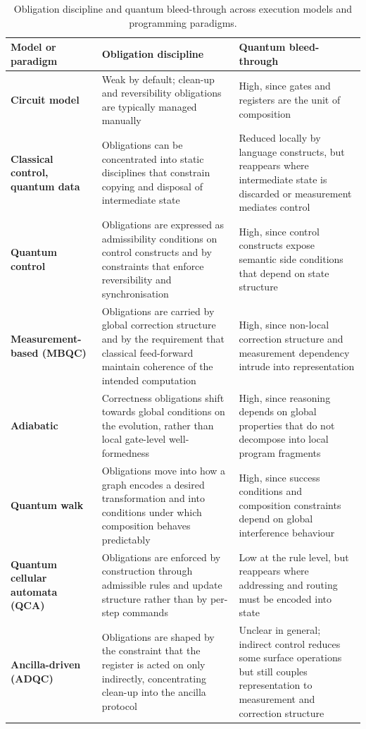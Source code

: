 \begin{table}[htbp]
    \centering
    \caption{Obligation discipline and quantum bleed-through across execution models and programming paradigms.}
    \label{tab:lit_rev:quantum_programming:design_space_map_obl_bleed}
    \footnotesize
    \begin{tabularx}{\textwidth}{@{}p{2.0cm}XX@{}}
		\toprule
        \textbf{Model or paradigm} & \textbf{Obligation discipline} & \textbf{Quantum bleed-through} \\
        \midrule
        \textbf{Circuit model} & Weak by default; clean-up and reversibility obligations are typically managed manually & High, since gates and registers are the unit of composition \\
        \addlinespace
        \textbf{Classical control, quantum data} & Obligations can be concentrated into static disciplines that constrain copying and disposal of intermediate state & Reduced locally by language constructs, but reappears where intermediate state is discarded or measurement mediates control \\
        \addlinespace
        \textbf{Quantum control} & Obligations are expressed as admissibility conditions on control constructs and by constraints that enforce reversibility and synchronisation & High, since control constructs expose semantic side conditions that depend on state structure \\
        \addlinespace
        \textbf{Measurement-based (MBQC)} & Obligations are carried by global correction structure and by the requirement that classical feed-forward maintain coherence of the intended computation & High, since non-local correction structure and measurement dependency intrude into representation \\
        \addlinespace
        \textbf{Adiabatic} & Correctness obligations shift towards global conditions on the evolution, rather than local gate-level well-formedness & High, since reasoning depends on global properties that do not decompose into local program fragments \\
        \addlinespace
        \textbf{Quantum walk} & Obligations move into how a graph encodes a desired transformation and into conditions under which composition behaves predictably & High, since success conditions and composition constraints depend on global interference behaviour \\
        \addlinespace
        \textbf{Quantum cellular automata (QCA)} & Obligations are enforced by construction through admissible rules and update structure rather than by per-step commands & Low at the rule level, but reappears where addressing and routing must be encoded into state \\
        \addlinespace
        \textbf{Ancilla-driven (ADQC)} & Obligations are shaped by the constraint that the register is acted on only indirectly, concentrating clean-up into the ancilla protocol & Unclear in general; indirect control reduces some surface operations but still couples representation to measurement and correction structure \\
        \bottomrule
    \end{tabularx}
\end{table}


